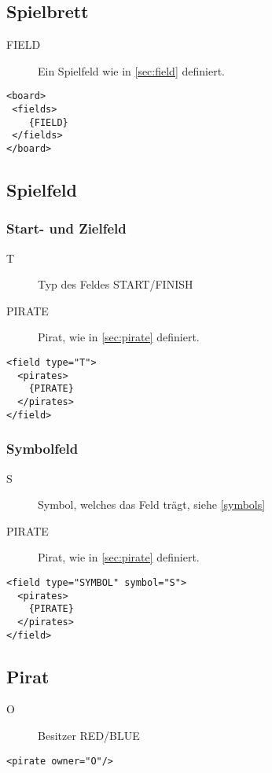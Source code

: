 \documentclass[12pt,a4paper, ngerman, oneside]{scrartcl}
\begin{document}
\subsection{\label{board}Spielbrett}
\begin{description}
\item[FIELD] Ein Spielfeld wie in \ref{sec:field} definiert.
\end{description}
\begin{verbatim}
<board>
 <fields>
 	{FIELD}
 </fields>
</board>
\end{verbatim}

\subsection{\label{sec:field}Spielfeld}
\subsubsection{\label{sec:startEndField} Start- und Zielfeld}
\begin{description}
\item[T] Typ des Feldes START/FINISH
\item[PIRATE] Pirat, wie in \ref{sec:pirate} definiert.
\end{description}
\begin{verbatim}
<field type="T">
  <pirates>
  	{PIRATE}
  </pirates>
</field>
\end{verbatim}

\subsubsection{\label{sec:symbolField} Symbolfeld}
\begin{description}
\item[S] Symbol, welches das Feld trägt, siehe \ref{symbols}
\item[PIRATE] Pirat, wie in \ref{sec:pirate} definiert.
\end{description}
\begin{verbatim}
<field type="SYMBOL" symbol="S">
  <pirates>
  	{PIRATE}
  </pirates>
</field>
\end{verbatim}

\subsection{\label{sec:pirate}Pirat}
\begin{description}
\item[O] Besitzer RED/BLUE
\end{description}
\begin{verbatim}
<pirate owner="O"/>
\end{verbatim}
\end{document}
